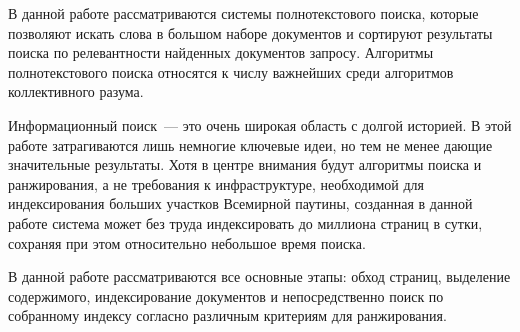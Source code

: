 \Introduction

В данной работе рассматриваются системы полнотекстового поиска, которые позволяют искать слова в большом наборе документов и сортируют результаты поиска по релевантности найденных документов запросу. Алгоритмы полнотекстового поиска относятся к числу важнейших среди алгоритмов коллективного разума.

Информационный поиск~--- это очень широкая область с долгой историей. В этой работе затрагиваются лишь немногие ключевые идеи, но тем не менее дающие значительные результаты. Хотя в центре внимания будут алгоритмы поиска и ранжирования, а не требования к инфраструктуре, необходимой для индексирования больших участков Всемирной паутины, созданная в данной работе система может без труда индексировать до миллиона страниц в сутки, сохраняя при этом относительно небольшое время поиска.

В данной работе рассматриваются все основные этапы: обход страниц, выделение содержимого, индексирование документов и непосредственно поиск по собранному индексу согласно различным критериям для ранжирования.
